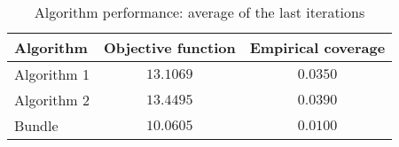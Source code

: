 \begin{table}[ht]
    \centering
    \begin{tabular}{lcc}
    \toprule
    \textbf{Algorithm} & \textbf{Objective function} & \textbf{Empirical coverage} \\
    \midrule
    Algorithm 1 & $13.1069$ & $0.0350$ \\
Algorithm 2 & $13.4495$ & $0.0390$ \\
Bundle & $10.0605$ & $0.0100$ \\
\bottomrule
    \end{tabular}
    \caption{Algorithm performance: average of the last iterations}
    \end{table}